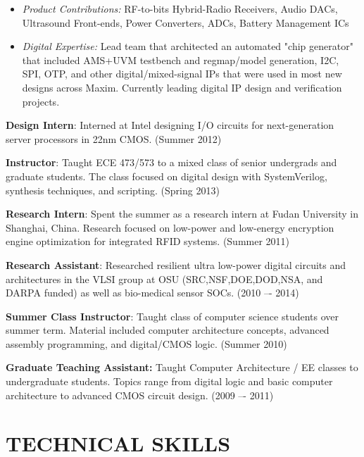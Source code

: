 \documentclass[line,margin]{res}
\begin{document}
\begin{resume}
\begin{itemize}
 \item \textit{Product Contributions:} RF-to-bits Hybrid-Radio Receivers, Audio DACs, Ultrasound Front-ends, Power Converters, ADCs, Battery Management ICs
 
 \item \textit{Digital Expertise:} Lead team that architected an automated "chip generator" that included AMS+UVM testbench and regmap/model generation, I2C, SPI, OTP, and other digital/mixed-signal IPs that were used in most new designs across Maxim. Currently leading digital IP design and verification projects.

\end{itemize}


\textbf{Design Intern}: Interned at Intel designing I/O circuits for next-generation server processors in 22nm CMOS. (Summer 2012)

\textbf{Instructor}: Taught ECE 473/573 to a mixed class of senior undergrads and graduate students. The class focused on digital design with SystemVerilog, synthesis techniques, and scripting. (Spring 2013)

\textbf{Research Intern}: Spent the summer as a research intern at Fudan University in Shanghai, China. Research focused on low-power and low-energy encryption engine optimization for
integrated RFID systems. (Summer 2011)

\textbf{Research Assistant}: Researched resilient ultra low-power digital circuits and architectures in the VLSI group at OSU (SRC,NSF,DOE,DOD,NSA, and DARPA funded) as well as bio-medical sensor SOCs. (2010 –- 2014)

\textbf{Summer Class Instructor}: Taught class of computer science students over summer term. Material included computer architecture concepts, advanced assembly programming, and digital/CMOS logic. (Summer 2010)

\textbf{Graduate Teaching Assistant:} Taught Computer Architecture / EE classes to undergraduate students. Topics range from digital logic and basic computer architecture to advanced CMOS circuit design. (2009 –- 2011)


 
\section{TECHNICAL SKILLS}


\end{resume}
\end{document}
